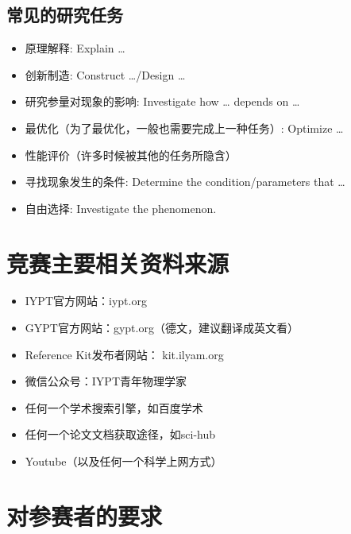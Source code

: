 \documentclass[a4paper,10pt,english]{sphinxmanual}
\begin{document}
\subsection{常见的研究任务}
\label{\detokenize{Introduction:id4}}\begin{itemize}
\item {} 
原理解释: Explain …

\item {} 
创新制造: Construct …/Design …

\item {} 
研究参量对现象的影响: Investigate how … depends on …

\item {} 
最优化（为了最优化，一般也需要完成上一种任务）: Optimize …

\item {} 
性能评价（许多时候被其他的任务所隐含）

\item {} 
寻找现象发生的条件: Determine the condition/parameters that …

\item {} 
自由选择: Investigate the phenomenon.

\end{itemize}


\section{竞赛主要相关资料来源}
\label{\detokenize{Introduction:id5}}\begin{itemize}
\item {} 
IYPT官方网站：iypt.org

\item {} 
GYPT官方网站：gypt.org（德文，建议翻译成英文看）

\item {} 
Reference Kit发布者网站： kit.ilyam.org

\item {} 
微信公众号：IYPT青年物理学家

\item {} 
任何一个学术搜索引擎，如百度学术

\item {} 
任何一个论文文档获取途径，如sci-hub

\item {} 
Youtube（以及任何一个科学上网方式）

\end{itemize}


\section{对参赛者的要求}
\label{\detokenize{Introduction:id6}}
\end{document}

